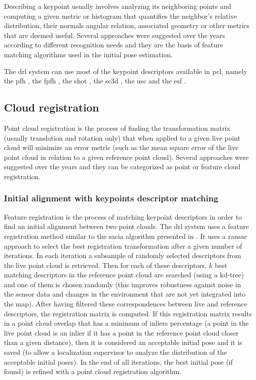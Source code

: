 Describing a keypoint usually involves analyzing its neighboring points and computing a given metric or histogram that quantifies the neighbor's relative distribution, their normals angular relation, associated geometry or other metrics that are deemed useful. Several approaches were suggested over the years according to different recognition needs and they are the basis of feature matching algorithms used in the initial pose estimation.

The \gls{drl} system can use most of the keypoint descriptors available in \gls{pcl}, namely the \gls{pfh} \cite{Rusu2008a}, the \gls{fpfh} \cite{Rusu2009}, the \gls{shot} \cite{Tombari2011}, the \gls{sc3d} \cite{Frome2004}, the \gls{usc} \cite{Tombari2010} and the \gls{esf} \cite{Wohlkinger2011}.


\subsection{Cloud registration}

Point cloud registration is the process of finding the transformation matrix (usually translation and rotation only) that when applied to a given live point cloud will minimize an error metric (such as the mean square error of the live point cloud in relation to a given reference point cloud). Several approaches were suggested over the years and they can be categorized as point or feature cloud registration.


\subsubsection{Initial alignment with keypoints descriptor matching}\label{subsec:localization-system_feature-registration}

Feature registration is the process of matching keypoint descriptors in order to find an initial alignment between two point clouds. The \gls{drl} system uses a feature registration method similar to the \gls{sacia} algorithm presented in \cite{Rusu2009}. It uses a \gls{ransac} approach to select the best registration transformation after a given number of iterations. In each iteration a subsample of randomly selected descriptors from the live point cloud is retrieved. Then for each of these descriptors, $k$ best matching descriptors in the reference point cloud are searched (using a kd-tree) and one of them is chosen randomly (this improves robustness against noise in the sensor data and changes in the environment that are not yet integrated into the map). After having filtered these correspondences between live and reference descriptors, the registration matrix is computed. If this registration matrix results in a point cloud overlap that has a minimum of inliers percentage (a point in the live point cloud is an inlier if it has a point in the reference point cloud closer than a given distance), then it is considered an acceptable initial pose and it is saved (to allow a localization supervisor to analyze the distribution of the acceptable initial poses). In the end of all iterations, the best initial pose (if found) is refined with a point cloud registration algorithm.


